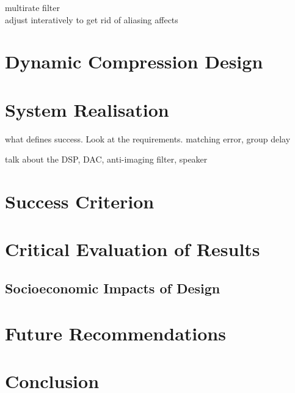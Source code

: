 \documentclass[12pt, onecolumn]{article}
\begin{document}
multirate filter\\
adjust interatively to get rid of aliasing affects


\section{Dynamic Compression Design}

\section{System Realisation}

what defines success. Look at the requirements. matching error, group delay

talk about the DSP, DAC, anti-imaging filter, speaker

\section{Success Criterion}


\section{Critical Evaluation of Results}



\subsection{Socioeconomic Impacts of Design}

\section{Future Recommendations}


\section{Conclusion}
\newpage
\printbibliography
\newpage
\end{document}
